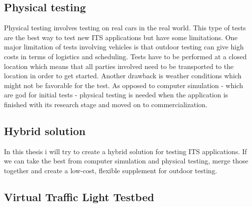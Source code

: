 \subsection{Physical testing}\label{subsec:physical-testing}
Physical testing involves testing on real cars in the real world. This type of tests are the best way to test new ITS applications but have some limitations. One major limitation of tests involving vehicles is that outdoor testing can give high costs in terms of logistics and scheduling. Tests have to be performed at a closed location which means that all parties involved need to be transported to the location in order to get started. Another drawback is weather conditions which might not be favorable for the test. As opposed to computer simulation - which are god for initial tests - physical testing is needed when the application is finished with its research stage and moved on to commercialization.

\subsection{Hybrid solution}\label{sec:hybrid-solution}
In this thesis i will try to create a hybrid solution for testing ITS applications. If we can take the best from computer simulation and physical testing, merge those together and create a low-cost, flexible supplement for outdoor testing. 

\subsection{Virtual Traffic Light Testbed}\label{subsec:vtl-testbed}


